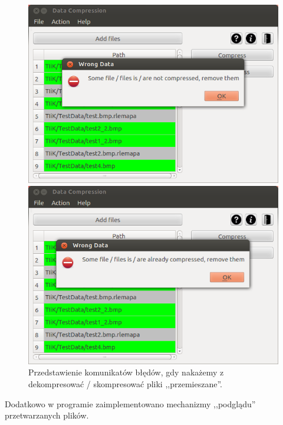 \documentclass[12pt,a4paper,notitlepage]{report}
\begin{document}
\begin{figure}[H]
	\centering
	\begin{minipage}{0.45\textwidth}
		\centering
		\includegraphics[scale=.4]{error1}
	\end{minipage}\hfill
	\begin{minipage}{0.45\textwidth}
		\centering
		\includegraphics[scale=.4]{error2}
	\end{minipage}
	\caption{Przedstawienie komunikatów błędów, gdy nakażemy z dekompresować / skompresować pliki ,,przemieszane''.}
\end{figure}
\vspace{1cm}
Dodatkowo w programie zaimplementowano mechanizmy ,,podglądu'' przetwarzanych plików.
\end{document}
